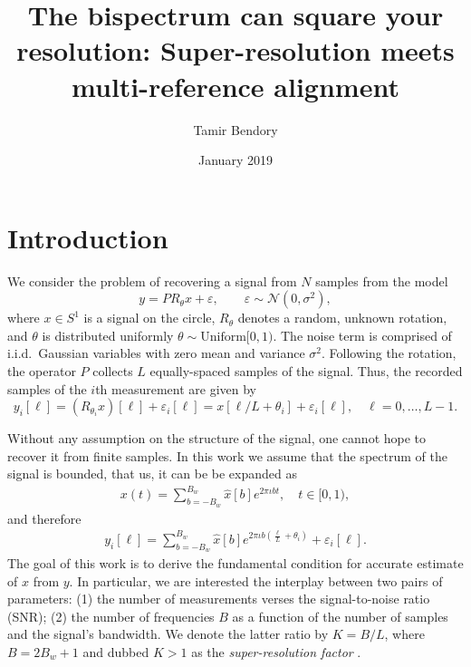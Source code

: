 \documentclass[english,12pt]{article}
\newcommand{\I}{\iota}
\newcommand{\tB}{B_w}
\newcommand{\SR}{super-resolution }
\numberwithin{equation}{section}
\numberwithin{thm}{section} %
\begin{document}
\title{The bispectrum can square your resolution: Super-resolution meets multi-reference alignment}

\author{Tamir Bendory}
\date{January 2019}
\maketitle


\section{Introduction}

We consider the problem of recovering a signal from $N$ samples from the model 
\begin{equation} \label{eq:model}
y = PR_\theta x + \varepsilon, \qquad \varepsilon\sim \mathcal{N}(0,\sigma^2),
\end{equation}
where $x\in S^1$ is a signal on the circle, $R_\theta$ denotes a random, unknown rotation, and $\theta$ is distributed uniformly $\theta\sim \text{Uniform}[0,1)$. The noise term is comprised of i.i.d.\ Gaussian variables with zero mean and variance $\sigma^2$.
Following the rotation, the operator $P$ collects $L$ equally-spaced samples of the signal. Thus, the recorded samples of the $i$th measurement are given by 
\begin{equation} \label{eq:continuous_measurements}
y_i[\ell] = \left(R_{\theta_i} x\right)[\ell] + \varepsilon_i[\ell] =  x[\ell/L+\theta_i] + \varepsilon_i[\ell], \quad \ell=0,\ldots,L-1.
\end{equation}


Without any assumption on the structure of the signal, one cannot hope to recover it from finite samples. In this work we assume that 
the spectrum of the signal is bounded, that us,  it can be  be expanded as 
\begin{eqnarray} \label{eq:fourier_expansion}
x(t) = \sum_{b=-\tB}^{\tB}\hat{x}[b]e^{2\pi\I bt }, \quad t\in[0,1),
\end{eqnarray}
and therefore 
\begin{eqnarray} \label{eq:fourier_expansion}
y_i[\ell] = \sum_{b=-\tB}^{\tB}\hat{x}[b]e^{2\pi\I b\left(\frac{\ell}{L}+\theta_i\right) }+ \varepsilon_i[\ell].
\end{eqnarray}
The goal of this work is to derive the fundamental condition for accurate estimate of $x$ from $y$. In particular, 
we are interested the interplay between two pairs of parameters: (1) the number of measurements verses the signal-to-noise ratio (SNR); (2) the number of frequencies $B$ as a function of the  number of samples and the signal's bandwidth. 
We denote the latter ratio by  $K=B/L$, where $B=2\tB+1$ and dubbed $K>1$ as the \emph{\SR factor} .  
\end{document}
